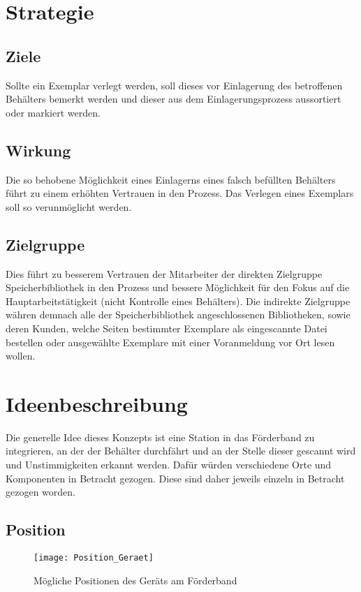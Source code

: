 \chapter{Strategie}

\section{Ziele}
Sollte ein Exemplar verlegt werden, soll dieses vor Einlagerung des betroffenen Behälters bemerkt werden und dieser aus dem Einlagerungsprozess aussortiert oder markiert werden.

\section{Wirkung}
Die so behobene Möglichkeit eines Einlagerns eines falsch befüllten Behälters führt zu einem erhöhten Vertrauen in den Prozess. Das Verlegen eines Exemplars soll so verunmöglicht werden.

\section{Zielgruppe}
Dies führt zu besserem Vertrauen der Mitarbeiter der direkten Zielgruppe Speicherbibliothek in den Prozess und bessere Möglichkeit für den Fokus auf die Hauptarbeitstätigkeit (nicht Kontrolle eines Behälters). Die indirekte Zielgruppe währen demnach alle der Speicherbibliothek angeschlossenen Bibliotheken, sowie deren Kunden, welche Seiten bestimmter Exemplare als eingescannte Datei bestellen oder ausgewählte Exemplare mit einer Voranmeldung vor Ort lesen wollen.

\chapter{Ideenbeschreibung}

Die generelle Idee dieses Konzepts ist eine Station in das Förderband zu integrieren, an der der Behälter durchfährt und an der Stelle dieser gescannt wird und Unstimmigkeiten erkannt werden. Dafür würden verschiedene Orte und Komponenten in Betracht gezogen. Diese sind daher jeweils einzeln in Betracht gezogen worden.

\section{Position}

\begin{figure}
	\centering
	\texttt{[image: Position\_Geraet]}
	\caption{Mögliche Positionen des Geräts am Förderband}
\end{figure}

